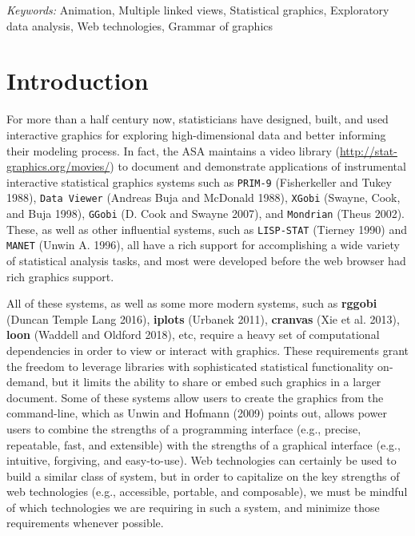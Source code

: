 \documentclass[12pt,]{article}
\theoremstyle{definition}
\theoremstyle{definition}
\theoremstyle{definition}
\theoremstyle{remark}
\begin{document}
\noindent
{\it Keywords:}  Animation, Multiple linked views, Statistical graphics, Exploratory data
analysis, Web technologies, Grammar of graphics
\vfill

\newpage
{} %


\hypertarget{intro}{%
\section{Introduction}\label{intro}}

For more than a half century now, statisticians have designed, built,
and used interactive graphics for exploring high-dimensional data and
better informing their modeling process. In fact, the ASA maintains a
video library (\url{http://stat-graphics.org/movies/}) to document and
demonstrate applications of instrumental interactive statistical
graphics systems such as \texttt{PRIM-9} (Fisherkeller and Tukey 1988),
\texttt{Data\ Viewer} (Andreas Buja and McDonald 1988), \texttt{XGobi}
(Swayne, Cook, and Buja 1998), \texttt{GGobi} (D. Cook and Swayne 2007),
and \texttt{Mondrian} (Theus 2002). These, as well as other influential
systems, such as \texttt{LISP-STAT} (Tierney 1990) and \texttt{MANET}
(Unwin A. 1996), all have a rich support for accomplishing a wide
variety of statistical analysis tasks, and most were developed before
the web browser had rich graphics support.

All of these systems, as well as some more modern systems, such as
\textbf{rggobi} (Duncan Temple Lang 2016), \textbf{iplots} (Urbanek
2011), \textbf{cranvas} (Xie et al. 2013), \textbf{loon} (Waddell and
Oldford 2018), etc, require a heavy set of computational dependencies in
order to view or interact with graphics. These requirements grant the
freedom to leverage libraries with sophisticated statistical
functionality on-demand, but it limits the ability to share or embed
such graphics in a larger document. Some of these systems allow users to
create the graphics from the command-line, which as Unwin and Hofmann
(2009) points out, allows power users to combine the strengths of a
programming interface (e.g., precise, repeatable, fast, and extensible)
with the strengths of a graphical interface (e.g., intuitive, forgiving,
and easy-to-use). Web technologies can certainly be used to build a
similar class of system, but in order to capitalize on the key strengths
of web technologies (e.g., accessible, portable, and composable), we
must be mindful of which technologies we are requiring in such a system,
and minimize those requirements whenever possible.
\end{document}
